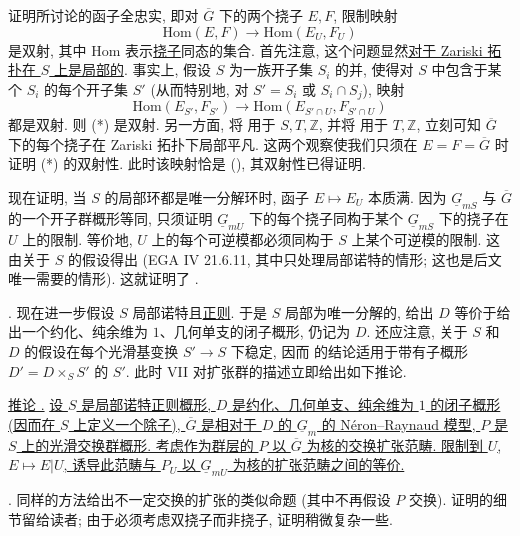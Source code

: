 证明所讨论的函子全忠实, 即对 $\overline G$ 下的两个挠子 $E,F$, 限制映射
\begin{equation}\tag{*}
 \mathrm{Hom}(E,F)\longrightarrow\mathrm{Hom}(E_U,F_U)
\end{equation}
是双射, 其中 $\mathrm{Hom}$ 表示\underline{挠子}同态的集合. 首先注意, 这个问题显然\underline{对于 Zariski 拓扑在 $S$ 上是局部的}. 事实上, 假设 $S$ 为一族开子集 $S_i$ 的并, 使得对 $S$ 中包含于某个 $S_i$ 的每个开子集 $S'$ (从而特别地, 对 $S'=S_i$ 或 $S_i\cap S_j$), 映射
\[
 \mathrm{Hom}(E_{S'},F_{S'})
 \longrightarrow
 \mathrm{Hom}(E_{S'\cap U},F_{S'\cap U})
\]
都是双射. 则 (*) 是双射. 另一方面, 将  用于 $S,T,\mathbb Z$, 并将  用于 $T,\mathbb Z$, 立刻可知 $\overline G$ 下的每个挠子在 Zariski 拓扑下局部平凡. 这两个观察使我们只须在 $E=F=\overline G$ 时证明 (*) 的双射性. 此时该映射恰是 (), 其双射性已得证明.

现在证明, 当 $S$ 的局部环都是唯一分解环时, 函子 $E\mapsto E_U$ 本质满. 因为 $\underline G_{mS}$ 与 $\overline G$ 的一个开子群概形等同, 只须证明 $\underline G_{mU}$ 下的每个挠子同构于某个 $\underline G_{mS}$ 下的挠子在 $U$ 上的限制. 等价地, $U$ 上的每个可逆模都必须同构于 $S$ 上某个可逆模的限制. 这由关于 $S$ 的假设得出 (EGA IV 21.6.11, 其中只处理局部诺特的情形; 这也是后文唯一需要的情形). 这就证明了 .

\medskip
\noindent {}. 现在进一步假设 $S$ 局部诺特且\underline{正则}. 于是 $S$ 局部为唯一分解的, 给出 $D$ 等价于给出一个约化、纯余维为 $1$、几何单支的闭子概形, 仍记为 $D$. 还应注意, 关于 $S$ 和 $D$ 的假设在每个光滑基变换 $S'\to S$ 下稳定, 因而  的结论适用于带有子概形 $D'=D\times_S S'$ 的 $S'$. 此时 VII  对扩张群的描述立即给出如下推论.

\medskip
\noindent\underline{推论 .} \underline{设 $S$ 是局部诺特正则概形, $D$ 是约化、几何单支、纯余维为 $1$ 的闭子概形 (因而在 $S$ 上定义一个除子), $\overline G$ 是相对于 $D$ 的 $\underline G_m$ 的 N\'eron--Raynaud 模型, $P$ 是 $S$ 上的光滑交换群概形. 考虑作为群层的 $P$ 以 $\overline G$ 为核的交换扩张范畴. 限制到 $U$, $E\mapsto E|U$, 诱导此范畴与 $P_U$ 以 $\underline G_{mU}$ 为核的扩张范畴之间的等价.}

\medskip
\noindent {}. 同样的方法给出不一定交换的扩张的类似命题 (其中不再假设 $P$ 交换). 证明的细节留给读者; 由于必须考虑双挠子而非挠子, 证明稍微复杂一些.


